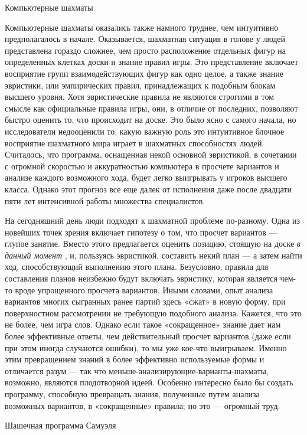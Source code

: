 \documentclass[../main.tex]{subfiles}
\begin{document}
Компьютерные шахматы

Компьютерные шахматы оказались также намного труднее, чем интуитивно предполагалось в начале. Оказывается, шахматная ситуация в голове у людей представлена гораздо сложнее, чем просто расположение отдельных фигур на определенных клетках доски и знание правил игры. Это представление включает восприятие групп взаимодействующих фигур как одно целое, а также знание эвристики, или эмпирических правил, принадлежащих к подобным блокам высшего уровня. Хотя эвристические правила не являются строгими в том смысле как официальные правила игры, они, в отличие от последних, позволяют быстро оценить то, что происходит на доске. Это было ясно с самого начала, но исследователи недооценили то, какую важную роль это интуитивное блочное восприятие шахматного мира играет в шахматных способностях людей. Считалось, что программа, оснащенная некой основной эвристикой, в сочетании с огромной скоростью и аккуратностью компьютера в просчете вариантов и анализе каждого возможного хода, будет легко выигрывать у игроков высшего класса. Однако этот прогноз все еще далек от исполнения даже после двадцати пяти лет интенсивной работы множества специалистов.

На сегодняшний день люди подходят к шахматной проблеме по-разному. Одна из новейших точек зрения включает гипотезу о том, что просчет вариантов --- глупое занятие. Вместо этого предлагается оценить позицию, стоящую на доске \emph{в данный момент} , и, пользуясь эвристикой, составить некий план --- а затем найти ход, способствующий выполнению этого плана. Безусловно, правила для составления планов неизбежно будут включать эвристику, которая является чем-то вроде упрощенного просчета вариантов. Иными словами, опыт анализа вариантов многих сыгранных ранее партий здесь «сжат» в новую форму, при поверхностном рассмотрении не требующую подобного анализа. Кажется, что это не более, чем игра слов. Однако если такое «сокращенное» знание дает нам более эффективные ответы, чем действительный просчет вариантов (даже если при этом иногда случаются ошибки), то мы уже кое-что выигрываем. Именно этим превращением знаний в более эффективно используемые формы и отличается разум --- так что меньше-анализирующие-варианты-шахматы, возможно, являются плодотворной идеей. Особенно интересно было бы создать программу, способную превращать знания, полученные путем анализа возможных вариантов, в «сокращенные» правила; но это --- огромный труд.

Шашечная программа Самуэля
\end{document}
